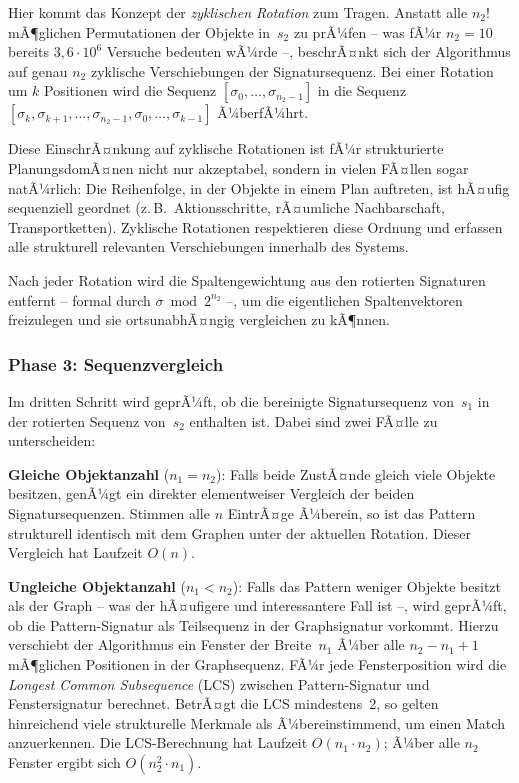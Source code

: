 ﻿\documentclass[a4paper,12pt]{article}
\theoremstyle{definition}
\begin{document}
Hier kommt das Konzept der \emph{zyklischen Rotation} zum Tragen. Anstatt alle $n_2!$ mÃ¶glichen Permutationen der Objekte in~$s_2$ zu prÃ¼fen -- was fÃ¼r $n_2 = 10$ bereits $3{,}6 \cdot 10^6$ Versuche bedeuten wÃ¼rde --, beschrÃ¤nkt sich der Algorithmus auf genau $n_2$ zyklische Verschiebungen der Signatursequenz. Bei einer Rotation um $k$ Positionen wird die Sequenz $[\sigma_0, \ldots, \sigma_{n_2-1}]$ in die Sequenz $[\sigma_k, \sigma_{k+1}, \ldots, \sigma_{n_2-1}, \sigma_0, \ldots, \sigma_{k-1}]$ Ã¼berfÃ¼hrt.

Diese EinschrÃ¤nkung auf zyklische Rotationen ist fÃ¼r strukturierte PlanungsdomÃ¤nen nicht nur akzeptabel, sondern in vielen FÃ¤llen sogar natÃ¼rlich: Die Reihenfolge, in der Objekte in einem Plan auftreten, ist hÃ¤ufig sequenziell geordnet (z.\,B.\ Aktionsschritte, rÃ¤umliche Nachbarschaft, Transportketten). Zyklische Rotationen respektieren diese Ordnung und erfassen alle strukturell relevanten Verschiebungen innerhalb des Systems.

Nach jeder Rotation wird die Spaltengewichtung aus den rotierten Signaturen entfernt -- formal durch $\sigma \bmod 2^{n_2}$ --, um die eigentlichen Spaltenvektoren freizulegen und sie ortsunabhÃ¤ngig vergleichen zu kÃ¶nnen.

\subsubsection*{Phase 3: Sequenzvergleich}

Im dritten Schritt wird geprÃ¼ft, ob die bereinigte Signatursequenz von~$s_1$ in der rotierten Sequenz von~$s_2$ enthalten ist. Dabei sind zwei FÃ¤lle zu unterscheiden:

\textbf{Gleiche Objektanzahl} ($n_1 = n_2$): Falls beide ZustÃ¤nde gleich viele Objekte besitzen, genÃ¼gt ein direkter elementweiser Vergleich der beiden Signatursequenzen. Stimmen alle $n$ EintrÃ¤ge Ã¼berein, so ist das Pattern strukturell identisch mit dem Graphen unter der aktuellen Rotation. Dieser Vergleich hat Laufzeit $O(n)$.

\textbf{Ungleiche Objektanzahl} ($n_1 < n_2$): Falls das Pattern weniger Objekte besitzt als der Graph -- was der hÃ¤ufigere und interessantere Fall ist --, wird geprÃ¼ft, ob die Pattern-Signatur als Teilsequenz in der Graphsignatur vorkommt. Hierzu verschiebt der Algorithmus ein Fenster der Breite~$n_1$ Ã¼ber alle $n_2 - n_1 + 1$ mÃ¶glichen Positionen in der Graphsequenz. FÃ¼r jede Fensterposition wird die \emph{Longest Common Subsequence} (LCS) zwischen Pattern-Signatur und Fenstersignatur berechnet. BetrÃ¤gt die LCS mindestens~2, so gelten hinreichend viele strukturelle Merkmale als Ã¼bereinstimmend, um einen Match anzuerkennen. Die LCS-Berechnung hat Laufzeit $O(n_1 \cdot n_2)$; Ã¼ber alle $n_2$ Fenster ergibt sich $O(n_2^2 \cdot n_1)$.
\end{document}
